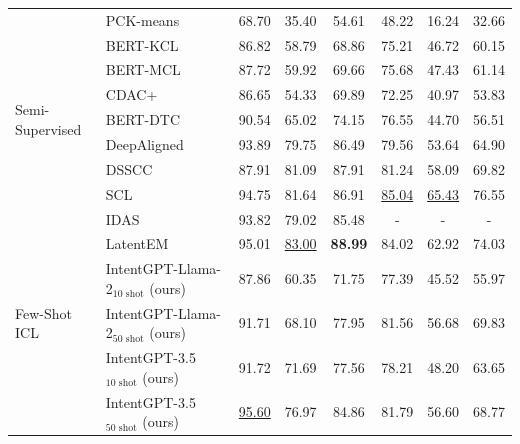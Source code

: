 \documentclass[11pt]{article}
\begin{document}
\begin{table}[ht]
{\begin{tabular}{@{}llcccccc@{}}
        \midrule
        \multirow{9}{*}{\centering Semi-Supervised}   
                                      & PCK-means~\citep{basu2004active} & 68.70 & 35.40 & 54.61 & 48.22 & 16.24 & 32.66 \\
                                      & BERT-KCL~\citep{hsu2017learning} & 86.82 & 58.79 & 68.86 & 75.21 & 46.72 & 60.15 \\
                                      & BERT-MCL~\citep{hsu2019multi} & 87.72 & 59.92 & 69.66 & 75.68 & 47.43 & 61.14 \\
                                      & CDAC+~\citep{lin2020discovering} & 86.65 & 54.33 & 69.89 & 72.25 & 40.97 & 53.83 \\
                                      & BERT-DTC~\citep{han2019learning} & 90.54 & 65.02 & 74.15 & 76.55 & 44.70 & 56.51 \\
                                      & DeepAligned~\citep{zhang2021discovering} & 93.89 & 79.75 & 86.49 & 79.56 & 53.64 & 64.90 \\
                                      & DSSCC~\citep{kumar2022intent} & 87.91 & 81.09 & 87.91 & 81.24 & 58.09 & 69.82 \\ 
                                      & SCL~\citep{shen2021semi} & 94.75 & 81.64 & 86.91 & \underline{85.04} & \underline{65.43} & 76.55\\ 
                                      & IDAS~\citep{de2023idas} & 93.82 & 79.02 & 85.48 & - & - & - \\
                                      & LatentEM~\citep{zhou2023probabilistic} & 95.01 & \underline{83.00} & \textbf{88.99} & 84.02 & 62.92 & 74.03\\ 
                                      
                                      
        \midrule
        \multirow{3}{*}{\centering Few-Shot ICL}     
                                      & IntentGPT-Llama-2$_\text{10 shot}$ (ours) & 87.86 & 60.35 & 71.75 & 77.39 & 45.52 & 55.97\\
                                      & IntentGPT-Llama-2$_\text{50 shot}$ (ours) & 91.71 & 68.10 & 77.95 & 81.56 & 56.68 & 69.83\\
                                      & IntentGPT-3.5$_\text{10 shot}$ (ours) & 91.72 & 71.69 & 77.56 & 78.21 & 48.20 & 63.65\\

                                      & IntentGPT-3.5$_\text{50 shot}$ (ours) & \underline{95.60} & 76.97 & 84.86 & 81.79 & 56.60 & 68.77 \\
                                      

\end{tabular}}
\end{table}
\end{document}
